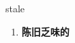 
\begin{frame}
{\huge stale}
\begin{center}
\begin{enumerate}\Large
  \item \textbf{陈旧乏味的}
\end{enumerate}
\end{center}
\end{frame}
